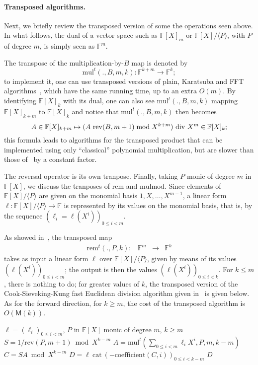 \documentclass[12pt]{article}
\def\M {\ensuremath{\mathsf{M}}}
\def\F {\ensuremath{\mathbb{F}}}
\def\mul {\ensuremath{\mathrm{mul}}}
\def\rem {\ensuremath{\mathrm{rem}}}
\def\cat {\ensuremath{\mathrm{cat}}}
\def\coeff {\ensuremath{\mathrm{coefficient}}}
\def\mulmod {\ensuremath{\mathrm{mulmod}}}
\def\rev {\ensuremath{\mathrm{rev}}}
\begin{document}
\paragraph{Transposed algorithms.}
Next, we briefly review the transposed version of some the operations
seen above. In what follows, the dual of a vector space such as
$\F[X]_m$ or $\F[X]/\langle P \rangle$, with $P$ of degree $m$, is
simply seen as $\F^m$.

The transpose of the multiplication-by-$B$ map is denoted by
$$\mul^t(.,B,m,k): \F^{k+m} \to \F^k;$$ to implement it, one can use
transposed versions of plain, Karatsuba and
FFT algorithms~\cite{bostan+lecerf+schost:tellegen,hanrot+quercia+zimmermann},
which have the same running time, up to an extra $O(m)$.
By identifying $\F[X]_k$ with its dual, one can also see
$\mul^t(.,B,m,k)$ mapping $\F[X]_{k+m}$ to $\F[X]_{k}$ and notice that
$\mul^t(.,B,m,k)$ then becomes $$A \in \F[X]_{k+m} \mapsto
(A\ \rev(B,m+1) \bmod X^{k+m}){\rm~div~}X^{m} \in \F[X]_k;$$ this
formula leads to algorithms for the transposed product that can be
implemented using only ``classical'' polynomial multiplication, but
are slower than those
of~\cite{bostan+lecerf+schost:tellegen,hanrot+quercia+zimmermann} by a
constant factor. 

The reversal operator is its own tranpose. Finally, taking $P$ monic
of degree $m$ in $\F[X]$, we discuss the tranposes of $\rem$ and
$\mulmod$. Since elements of $\F[X]/\langle P \rangle$ are given on
the monomial basis $1,X,\dots,X^{m-1}$, a linear form $\ell:
\F[X]/\langle P \rangle \to \F$ is represented by its values on the
monomial basis, that is, by the sequence $(\ell_i=\ell(X^i))_{0 \le i
  < m}$.

As showed in~\cite{bostan+lecerf+schost:tellegen}, the transposed map
$$
\begin{array}{cccc}
\rem^t(.,P,k): &\F^m& \to &\F^k
\end{array}$$ 
takes as input a linear form $\ell$ over $\F[X]/\langle P \rangle$,
given by means of its values $(\ell(X^i))_{0 \le i < m}$; the output
is then the values $(\ell(X^i))_{0 \le i < k}$. For $k \le m$, there
is nothing to do; for greater values of $k$, the transposed version of
the Cook-Sieveking-Kung fast Euclidean division algorithm given
in~\cite{bostan+lecerf+schost:tellegen} is given below. As for the
forward direction, for $k \ge m$, the cost of the transposed algorithm
is $O(\M(k))$.

\begin{algorithm}[H]
  \caption{$\rem^t(\ell,P,k)$}
  \begin{algorithmic}[1]
    \REQUIRE $\ell=(\ell_i)_{0 \le i < m}$, $P$ in $\F[X]$ monic of degree $m$, $k \ge m$
    \STATE $S = 1/\rev(P, m+1) \bmod X^{k-m}$
    \STATE $A = \mul^t( \sum_{0 \le i < m} \ell_{i}X^i, P, m, k-m)$
    \STATE $C = S A \bmod X^{k-m}$
    \STATE $D = \ell ~\cat~ (-\coeff(C,i))_{0 \le i < k-m}$
    \RETURN $D$
  \end{algorithmic}
\end{algorithm}
\end{document}
